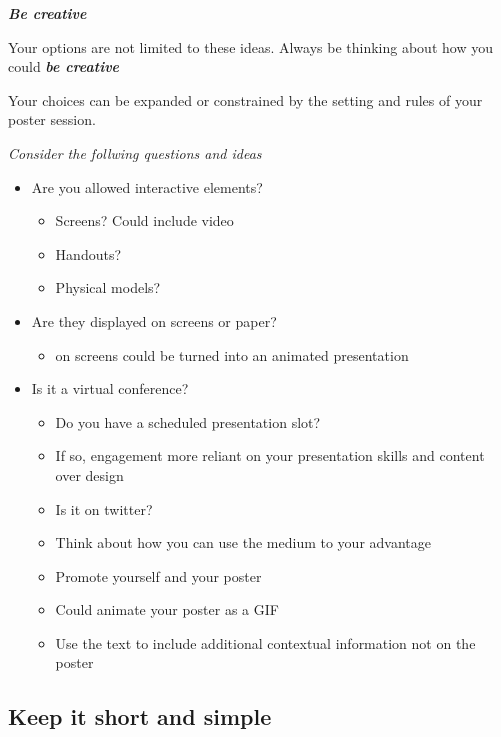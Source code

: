 \documentclass[
  titlepage]{book}
\providecommand{\tightlist}{%
  \setlength{\itemsep}{0pt}\setlength{\parskip}{0pt}}
\begin{document}
\textbf{\emph{Be creative}}

Your options are not limited to these ideas. Always be thinking about how you could \textbf{\emph{be creative}}

Your choices can be expanded or constrained by the setting and rules of your poster session.

\emph{Consider the follwing questions and ideas}

\begin{itemize}
\tightlist
\item
  Are you allowed interactive elements?

  \begin{itemize}
  \tightlist
  \item
    Screens? Could include video
  \item
    Handouts?
  \item
    Physical models?
  \end{itemize}
\item
  Are they displayed on screens or paper?

  \begin{itemize}
  \tightlist
  \item
    on screens could be turned into an animated presentation
  \end{itemize}
\item
  Is it a virtual conference?

  \begin{itemize}
  \tightlist
  \item
    Do you have a scheduled presentation slot?
  \item
    If so, engagement more reliant on your presentation skills and content over design
  \item
    Is it on twitter?
  \item
    Think about how you can use the medium to your advantage
  \item
    Promote yourself and your poster
  \item
    Could animate your poster as a GIF
  \item
    Use the text to include additional contextual information not on the poster
  \end{itemize}
\end{itemize}

\hypertarget{keep-it-short-and-simple}{%
\subsection{Keep it short and simple}\label{keep-it-short-and-simple}}
\end{document}
